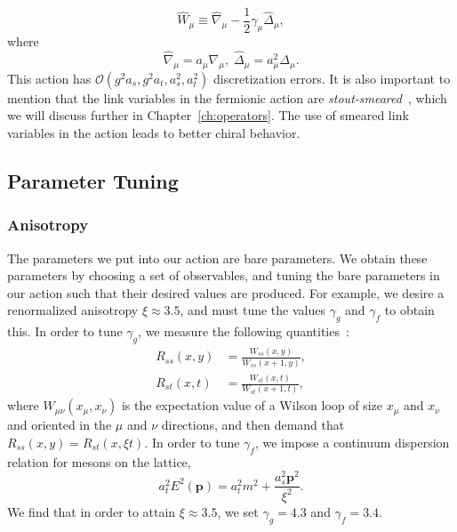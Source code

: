 \begin{equation}
    \hat{W}_{\mu} \equiv \hat{\nabla}_{\mu}-\frac{1}{2} \gamma_{\mu} \hat{\Delta}_{\mu},
\end{equation}
where
\begin{equation}
    \hat{\nabla}_{\mu}=a_{\mu} \nabla_{\mu},\; \hat{\Delta}_{\mu}=a_{\mu}^{2} \Delta_{\mu}.
\end{equation}
This action has $\mathcal{O}\left(g^{2} a_{s}, g^{2} a_{t}, a_{s}^{2}, a_{t}^{2}\right)$ discretization errors. It is also important to mention that the link variables in the fermionic action are \emph{stout-smeared}~\cite{Morningstar:2003gk}, which we will discuss further in Chapter~\ref{ch:operators}. The use of smeared link variables in the action leads to better chiral behavior.
\subsection{Parameter Tuning}\label{sec:tuning}
\subsubsection{Anisotropy}
The parameters we put into our action are bare parameters. We obtain these parameters by choosing a set of observables, and tuning the bare parameters in our action such that their desired values are produced. For example, we desire a renormalized anisotropy $\xi\approx 3.5$, and must tune the values $\gamma_g$ and $\gamma_f$ to obtain this. In order to tune $\gamma_g$, we measure the following quantities~\cite{Klassen:1998ua}:
\begin{equation}
    \begin{aligned}
        R_{s s}(x, y)&=\frac{W_{s s}(x, y)}{W_{s s}(x+1, y)},\\
        R_{s t}(x, t)&=\frac{W_{s t}(x, t)}{W_{s t}(x+1, t)},
    \end{aligned}
\end{equation}
where $W_{\mu\nu}(x_\mu, x_\nu)$ is the expectation value of a Wilson loop of size $x_\mu$ and $x_\nu$ and oriented in the $\mu$ and $\nu$ directions, and then demand that $R_{s s}(x, y)=R_{s t}(x, \xi t)$.  In order to tune $\gamma_f$, we impose a continuum dispersion relation for mesons on the lattice,
\begin{equation}
    a_{t}^{2} E^{2}(\boldsymbol{p})=a_{t}^{2} m^{2}+\frac{a_{s}^{2} \boldsymbol{p}^{2}}{\xi^{2}}.
\end{equation}
We find that in order to attain $\xi\approx 3.5$, we set $\gamma_g = 4.3$ and $\gamma_f = 3.4$.

